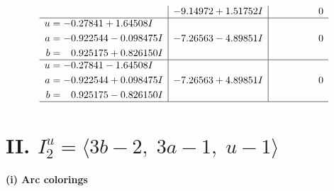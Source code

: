 \documentclass[1p]{elsarticle_modified}
\theoremstyle{definition}
\begin{document}
$$\begin{array}{c|c|c}
 & -9.14972 + 1.51752 I & \phantom{-0.000000 } 0 \\ \hline\begin{aligned}
u &= -0.27841 + 1.64508 I \\
a &= -0.922544 - 0.098475 I \\
b &= \phantom{-}0.925175 + 0.826150 I\end{aligned}
 & -7.26563 - 4.89851 I & \phantom{-0.000000 } 0 \\ \hline\begin{aligned}
u &= -0.27841 - 1.64508 I \\
a &= -0.922544 + 0.098475 I \\
b &= \phantom{-}0.925175 - 0.826150 I\end{aligned}
 & -7.26563 + 4.89851 I & \phantom{-0.000000 } 0\\
 \hline 
 \end{array}$$\newpage\newpage\renewcommand{\arraystretch}{1}
\centering \section*{II. $I^u_{2}= \langle 3 b-2,\;3 a-1,\;u-1 \rangle$}
\flushleft \textbf{(i) Arc colorings}\\
\end{document}
